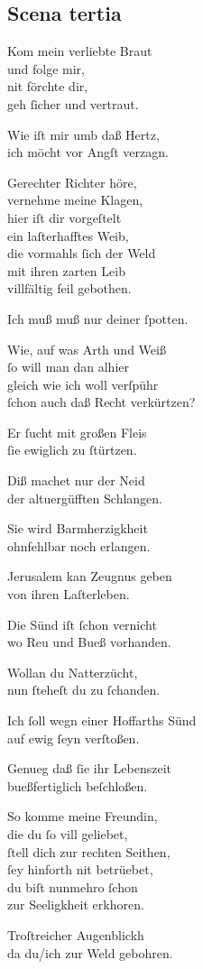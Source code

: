 \documentclass{ees}
\newenvironment{lyrics}[1]{%
  \subsection{#1}\nopagebreak%
  \begin{lyricslist}%
  \let\voice\item%
}{%
  \end{lyricslist}%
}
\begin{document}
\begin{lyrics}{Scena tertia}
  \voice[St: Michael]
  Kom mein verliebte Braut\\
  und folge mir,\\
  nit förchte dir,\\
  geh ſicher und vertraut.

  \voice[St: Magdalena]
  Wie iſt mir umb daß Hertz,\\
  ich möcht vor Angſt verzagn.

  \voice[Lucifer]
  Gerechter Richter höre,\\
  vernehme meine Klagen,\\
  hier iſt dir vorgeſtelt\\
  ein laſterhafftes Weib,\\
  die vormahls ſich der Weld\\
  mit ihren zarten Leib\\
  villfältig feil gebothen.

  \voice[Judex]
  Ich muß muß nur deiner ſpotten.

  \voice[Lucifer]
  Wie, auf was Arth und Weiß\\
  ſo will man dan alhier\\
  gleich wie ich woll verſpühr\\
  ſchon auch daß Recht verkürtzen?

  \voice[St: Michael]
  Er ſucht mit großen Fleis\\
  ſie ewiglich zu ſtürtzen.

  \voice[Judex]
  Diß machet nur der Neid\\
  der altuergüfften Schlangen.

  \voice[St: Michael]
  Sie wird Barmherzigkheit\\
  ohnfehlbar noch erlangen.

  \voice[Lucifer]
  Jerusalem kan Zeugnus geben\\
  von ihren Laſterleben.

  \voice[Judex]
  Die Sünd iſt ſchon vernicht\\
  wo Reu und Bueß vorhanden.

  \voice[St: Michael]
  Wollan du Natterzücht,\\
  nun ſteheſt du zu ſchanden.

  \voice[Lucifer]
  Ich ſoll wegn einer Hoffarths Sünd\\
  auf ewig ſeyn verſtoßen.

  \voice[St: Michael]
  Genueg daß ſie ihr Lebenszeit\\
  bueßfertiglich beſchloßen.

  \voice[Judex]
  So komme meine Freundin,\\
  die du ſo vill geliebet,\\
  ſtell dich zur rechten Seithen,\\
  ſey hinforth nit betrüebet,\\
  du biſt nunmehro ſchon\\
  zur Seeligkheit erkhoren.

  \voice[St: Magdalena, St: Michael]
  Troſtreicher Augenblickh\\
  da du/ich zur Weld gebohren.
\end{lyrics}
\end{document}
